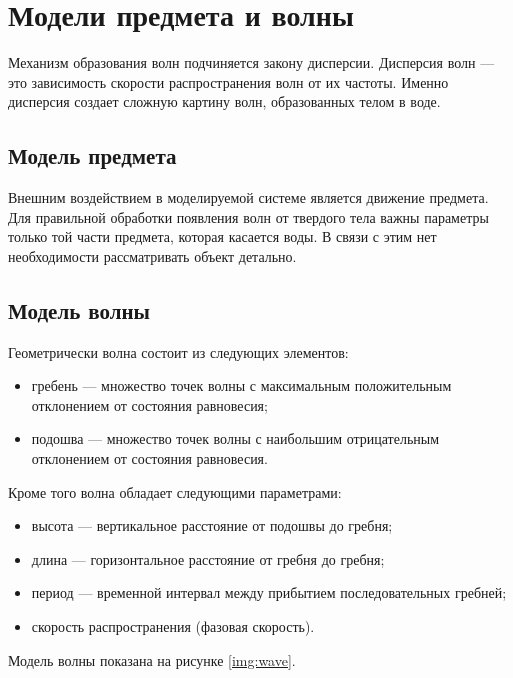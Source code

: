 \section{Модели предмета и волны}

Механизм образования волн подчиняется закону дисперсии. Дисперсия волн --- это зависимость скорости распространения волн от их частоты. Именно дисперсия создает сложную картину волн, образованных телом в воде.

\subsection{Модель предмета}

Внешним воздействием в моделируемой системе является движение предмета. Для правильной обработки появления волн от твердого тела важны параметры только той части предмета, которая касается воды. В связи с этим нет необходимости рассматривать объект детально.

\subsection{Модель волны}

Геометрически волна состоит из следующих элементов:

\begin{itemize}
	\item гребень --- множество точек волны с максимальным положительным отклонением от состояния равновесия;
	\item подошва --- множество точек волны с наибольшим отрицательным отклонением от состояния равновесия.
\end{itemize}

Кроме того волна обладает следующими параметрами:

\begin{itemize}
	\item высота --- вертикальное расстояние от подошвы до гребня;
	\item длина --- горизонтальное расстояние от гребня до гребня;
	\item период --- временной интервал между прибытием последовательных гребней;
	\item скорость распространения (фазовая скорость).
\end{itemize}

Модель волны показана на рисунке \ref{img:wave}.

